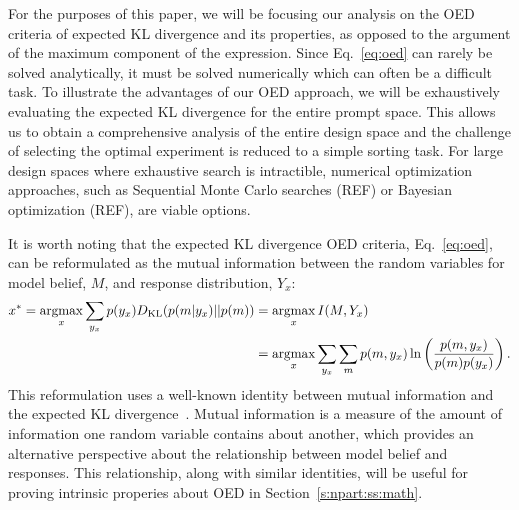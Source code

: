 \documentclass[11pt]{article}
\newcommand{\argmax}{\operatornamewithlimits{argmax}}
\begin{document}
For the purposes of this paper, we will be focusing our analysis on the OED criteria of expected KL divergence and its properties, as opposed to the argument of the maximum component of the expression. Since Eq.~\ref{eq:oed} can rarely be solved analytically, it must be solved numerically which can often be a difficult task. To illustrate the advantages of our OED approach, we will be exhaustively evaluating the expected KL divergence for the entire prompt space. This allows us to obtain a comprehensive analysis of the entire design space and the challenge of selecting the optimal experiment is reduced to a simple sorting task. For large design spaces where exhaustive search is intractible, numerical optimization approaches, such as Sequential Monte Carlo searches (REF) or Bayesian optimization (REF), are viable options. 

It is worth noting that the expected KL divergence OED criteria, Eq.~\ref{eq:oed}, can be reformulated as the mutual information between the random variables for model belief, $M$, and response distribution, $Y_x$:
\begin{align}
x^* = \argmax_{x} \sum\limits_{y_x} p(y_x) D_{\text{KL}}(p(m|y_x) || p(m)) &= \argmax_{x} I(M, Y_x) \notag \\
    &= \argmax_{x} \sum\limits_{y_x} \sum\limits_{m} p(m, y_x) \ln \left( \frac{p(m, y_x)}{p(m)p(y_x)}\right). \label{eq:mi}
\end{align}
This reformulation uses a well-known identity between mutual information and the expected KL divergence~\cite{cover91:eit}. Mutual information is a measure of the amount of information one random variable contains about another, which provides an alternative perspective about the relationship between model belief and responses. This relationship, along with similar identities, will be useful for proving intrinsic properies about OED in Section~\ref{s:npart:ss:math}.
\end{document}

